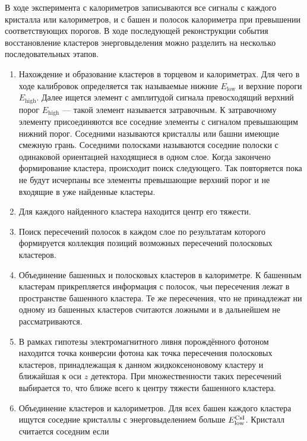 В ходе эксперимента с калориметров записываются все сигналы с каждого кристалла  или  калориметров,
и с башен и полосок  калориметра при превышении соответствующих порогов.
В ходе последующей реконструкции события восстановление кластеров энерговыделения можно разделить на несколько последовательных этапов.
\begin{enumerate}
    \item \label{itm:cluster_reco_1} Нахождение и образование кластеров в торцевом и  калориметрах.
    Для чего в ходе калибровок определяется так называемые нижние $E_{\text{low}}$ и верхние пороги $E_{\text{high}}$.
    Далее ищется элемент с амплитудой сигнала превосходящий верхний порог $E_{\text{high}}$
    --- такой элемент называется затравочным.
    К затравочному элементу присоединяются все соседние элементы с сигналом превышающим нижний порог.
    Соседними называются кристаллы или башни имеющие смежную грань.
    Соседними полосками называются соседние полоски с одинаковой ориентацией находящиеся в одном слое.
    Когда закончено формирование кластера,
    происходит поиск следующего.
    Так повторяется пока не будут исчерпаны все элементы превышающие верхний порог и не входящие в уже найденные кластеры.
    \item Для каждого найденного кластера находится центр его тяжести.
    \item Поиск пересечений полосок в каждом слое по результатам которого формируется коллекция позиций возможных пересечений полосковых кластеров.
    \item Объединение башенных и полосковых кластеров в  калориметре.
    К башенным кластерам прикрепляется информация с полосок,
    чьи пересечения лежат в пространстве башенного кластера.
    Те же пересечения,
    что не принадлежат ни одному из башенных кластеров считаются ложными и в дальнейшем не рассматриваются.
    \item В рамках гипотезы электромагнитного ливня порождённого фотоном находится точка конверсии фотона как точка пересечения полосковых кластеров,
    принадлежащая к данном жидкоксеноновому кластеру и ближайшая к оси $z$ детектора.
    При множественности таких пересечений выбирается то,
    что ближе всего к центру тяжести башенного кластера.
    \item Объединение кластеров  и  калориметров.
    Для всех башен каждого  кластера ищутся соседние  кристаллы
    с энерговыделением больше $E_{\text{low}}^{\ce{CsI}}$.
    Кристалл считается соседним если

\end{enumerate}

